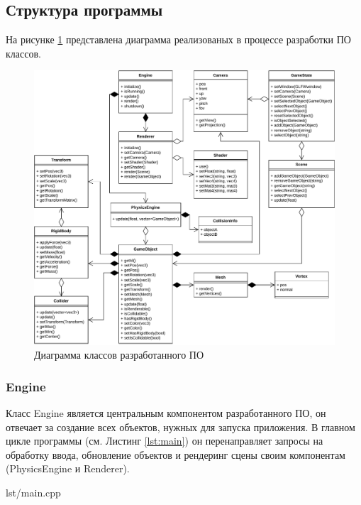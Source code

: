 \subsection{Структура программы}

На рисунке \ref{fig:uml} представлена диаграмма реализованых в процессе разработки ПО классов.

\begin{figure}[H]
	\centering
	\includegraphics[width=\textwidth]{diag/uml.pdf}
	\caption{Диаграмма классов разработанного ПО}
	\label{fig:uml}
\end{figure}

\subsubsection*{Engine}

Класс Engine является центральным компонентом разработанного ПО, он отвечает за создание всех объектов, нужных для запуска приложения.
В главном цикле программы (см. Листинг \ref{lst:main}) он перенаправляет запросы на обработку ввода, обновление объектов и рендеринг сцены своим компонентам (PhysicsEngine и Renderer).

\begin{code}
    \begin{lstinputlisting}[
            label={lst:main},
            caption={Точка входа и главный цикл},
        ]{lst/main.cpp}
    \end{lstinputlisting}
\end{code}

